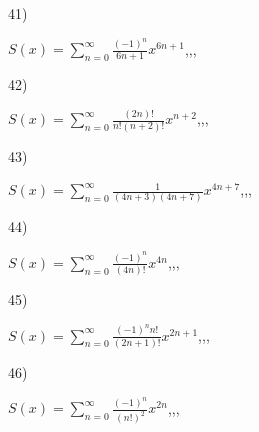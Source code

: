 \documentclass[11pt, ukrainian]{article}
\begin{document}
\par
\newpage
41) \space 
{%
{$S(x)=\sum\limits_{n=0}^{\infty}{\frac{(-1)^n}{6n+1}}{x^{{6n+1}}}$},,, \par \smallskip  
}
\par
\vspace{0.9cm}
42) \space 
{%
{$S(x)=\sum\limits_{n=0}^{\infty}{\frac{(2n)!}{n!(n+2)!}}{x^{{n+2}}}$},,, \par \smallskip  
}
\par
\vspace{0.9cm}
43) \space 
{%
{$S(x)=\sum\limits_{n=0}^{\infty}{\frac{1}{(4n+3)(4n+7)}}{x^{{4n+7}}}$},,, \par \smallskip  
}
\par
\vspace{0.9cm}
44) \space 
{%
{$S(x)=\sum\limits_{n=0}^{\infty}{\frac{(-1)^n}{(4n)!}}{x^{{4n}}}$},,, \par \smallskip  
}
\par
\vspace{0.9cm}
45) \space 
{%
{$S(x)=\sum\limits_{n=0}^{\infty}{\frac{{(-1)^n}{n!}}{(2n+1)!}}{x^{{2n+1}}}$},,, \par \smallskip  
}
\par
\vspace{0.9cm}
46) \space 
{%
{$S(x)=\sum\limits_{n=0}^{\infty}{\frac{(-1)^n}{(n!)^2}}{x^{{2n}}}$},,, \par \smallskip  
}
\end{document}
